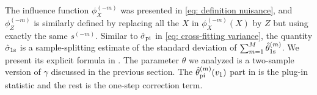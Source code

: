 \documentclass[11pt]{article}
\begin{document}
The influence function $\phi_X^{(-m)}$ was presented in \eqref{eq: definition nuisance}, and $\phi_Z^{(-m)}$ is similarly defined by replacing all the $X$ in $\phi_X^{(-m)}(X)$ by $Z$ but using exactly the same $s^{(-m)}$. Similar to $\hat \sigma_{\rm pi}$ in \eqref{eq: cross-fitting variance}, the quantity $\hat \sigma_{\rm 1s}$ is a sample-splitting estimate of the standard deviation of $\sum_{m=1}^M \hat{\theta}_{\rm 1s}^{(m)}$. We present its explicit formula in . The parameter $\theta$ we analyzed is a two-sample version of $\gamma$ discussed in the previous section. The $\hat{\theta}_{\rm pi}^{(m)}(v_1)$ part in  is the plug-in statistic and the rest is the one-step correction term. 




\end{document}
